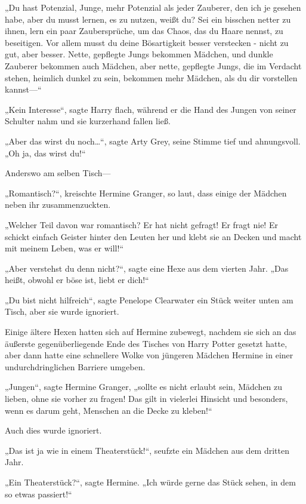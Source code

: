 {„Du hast Potenzial, Junge, mehr Potenzial als jeder Zauberer, den ich je gesehen habe, aber du musst lernen, es zu nutzen, weißt du? Sei ein bisschen netter zu ihnen, lern ein paar Zaubersprüche, um das Chaos, das du Haare nennst, zu beseitigen. Vor allem musst du deine Bösartigkeit besser verstecken - nicht zu gut, aber besser. Nette, gepflegte Jungs bekommen Mädchen, und dunkle Zauberer bekommen auch Mädchen, aber nette, gepflegte Jungs, die im Verdacht stehen, heimlich dunkel zu sein, bekommen mehr Mädchen, als du dir vorstellen kannst—“

„Kein Interesse“, sagte Harry flach, während er die Hand des Jungen von seiner Schulter nahm und sie kurzerhand fallen ließ.

„Aber das wirst du noch…“, sagte Arty Grey, seine Stimme tief und ahnungsvoll. „Oh ja, das wirst du!“

Anderswo am selben Tisch—

„Romantisch?“, kreischte Hermine Granger, so laut, dass einige der Mädchen neben ihr zusammenzuckten.

„Welcher Teil davon war romantisch? Er hat nicht gefragt! Er fragt nie! Er schickt einfach Geister hinter den Leuten her und klebt sie an Decken und macht mit meinem Leben, was er will!“

„Aber verstehst du denn nicht?“, sagte eine Hexe aus dem vierten Jahr. „Das heißt, obwohl er böse ist, liebt er dich!“

„Du bist nicht hilfreich“, sagte Penelope Clearwater ein Stück weiter unten am Tisch, aber sie wurde ignoriert.

Einige ältere Hexen hatten sich auf Hermine zubewegt, nachdem sie sich an das äußerste gegenüberliegende Ende des Tisches von Harry Potter gesetzt hatte, aber dann hatte eine schnellere Wolke von jüngeren Mädchen Hermine in einer undurchdringlichen Barriere umgeben.

„Jungen“, sagte Hermine Granger, „sollte es nicht erlaubt sein, Mädchen zu lieben, ohne sie vorher zu fragen! Das gilt in vielerlei Hinsicht und besonders, wenn es darum geht, Menschen an die Decke zu kleben!“

Auch dies wurde ignoriert.

„Das ist ja wie in einem Theaterstück!“, seufzte ein Mädchen aus dem dritten Jahr.

„Ein Theaterstück?“, sagte Hermine. „Ich würde gerne das Stück sehen, in dem so etwas passiert!“

}
